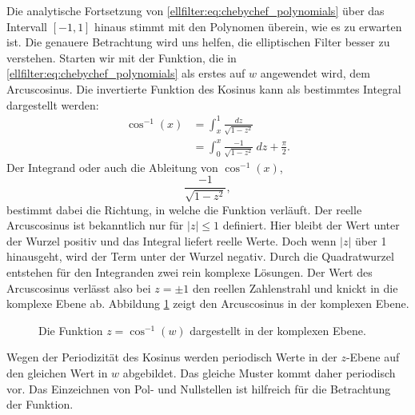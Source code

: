 Die analytische Fortsetzung von \eqref{ellfilter:eq:chebychef_polynomials} über das Intervall $[-1,1]$ hinaus stimmt mit den Polynomen überein, wie es zu erwarten ist.
Die genauere Betrachtung wird uns helfen, die elliptischen Filter besser zu verstehen.
Starten wir mit der Funktion, die in \eqref{ellfilter:eq:chebychef_polynomials} als erstes auf $w$ angewendet wird, dem Arcuscosinus.
%
Die invertierte Funktion des Kosinus kann als bestimmtes Integral dargestellt werden:
\begin{align}
    \cos^{-1}(x)
    &=
    \int_{x}^{1}
    \frac{
        dz
    }{
        \sqrt{
            1-z^2
        }
    }\\
    &=
    \int_{0}^{x}
    \frac{
        -1
    }{
        \sqrt{
            1-z^2
        }
    }
    ~dz
    + \frac{\pi}{2}.
\end{align}
Der Integrand oder auch die Ableitung von $\cos^{-1}(x)$,
\begin{equation}
    \frac{
        -1
    }{
        \sqrt{
            1-z^2
        }
    },
\end{equation}
bestimmt dabei die Richtung, in welche die Funktion verläuft.
Der reelle Arcuscosinus ist bekanntlich nur für $|z| \leq 1$ definiert.
Hier bleibt der Wert unter der Wurzel positiv und das Integral liefert reelle Werte.
Doch wenn $|z|$ über 1 hinausgeht, wird der Term unter der Wurzel negativ.
Durch die Quadratwurzel entstehen für den Integranden zwei rein komplexe Lösungen.
Der Wert des Arcuscosinus verlässt also bei $z= \pm 1$ den reellen Zahlenstrahl und knickt in die komplexe Ebene ab.
Abbildung \ref{ellfilter:fig:arccos} zeigt den Arcuscosinus in der komplexen Ebene.
\begin{figure}
    \centering
    
    \caption{Die Funktion $z = \cos^{-1}(w)$ dargestellt in der komplexen Ebene.}
    \label{ellfilter:fig:arccos}
\end{figure}
Wegen der Periodizität des Kosinus werden periodisch Werte in der $z$-Ebene auf den gleichen Wert in $w$ abgebildet.
Das gleiche Muster kommt daher periodisch vor.
Das Einzeichnen von Pol- und Nullstellen ist hilfreich für die Betrachtung der Funktion.


